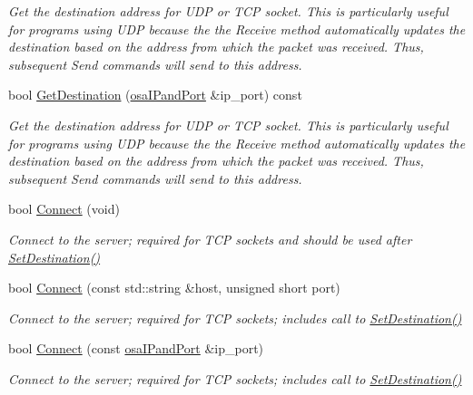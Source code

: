 \begin{DoxyCompactItemize}
\begin{DoxyCompactList}\small\item\em Get the destination address for U\+D\+P or T\+C\+P socket. This is particularly useful for programs using U\+D\+P because the the Receive method automatically updates the destination based on the address from which the packet was received. Thus, subsequent Send commands will send to this address. \end{DoxyCompactList}\item 
bool \hyperlink{classosa_socket_aa8030ca721b7d095cf26ca40e6d237a3}{Get\+Destination} (\hyperlink{structosa_i_pand_port}{osa\+I\+Pand\+Port} \&ip\+\_\+port) const 
\begin{DoxyCompactList}\small\item\em Get the destination address for U\+D\+P or T\+C\+P socket. This is particularly useful for programs using U\+D\+P because the the Receive method automatically updates the destination based on the address from which the packet was received. Thus, subsequent Send commands will send to this address. \end{DoxyCompactList}\item 
bool \hyperlink{classosa_socket_a26e1010cd5c499ed8b0b3ab6a43a50cd}{Connect} (void)
\begin{DoxyCompactList}\small\item\em Connect to the server; required for T\+C\+P sockets and should be used after \hyperlink{classosa_socket_a5a02b283355bf2beff6217bb2e01c03a}{Set\+Destination()} \end{DoxyCompactList}\item 
bool \hyperlink{classosa_socket_a003dbb8706ca2a332b8f2a8187626847}{Connect} (const std\+::string \&host, unsigned short port)
\begin{DoxyCompactList}\small\item\em Connect to the server; required for T\+C\+P sockets; includes call to \hyperlink{classosa_socket_a5a02b283355bf2beff6217bb2e01c03a}{Set\+Destination()} \end{DoxyCompactList}\item 
bool \hyperlink{classosa_socket_a90a8bc0002ea1bcdd3c1a48c9f7c1252}{Connect} (const \hyperlink{structosa_i_pand_port}{osa\+I\+Pand\+Port} \&ip\+\_\+port)
\begin{DoxyCompactList}\small\item\em Connect to the server; required for T\+C\+P sockets; includes call to \hyperlink{classosa_socket_a5a02b283355bf2beff6217bb2e01c03a}{Set\+Destination()} \end{DoxyCompactList}\item 

\end{DoxyCompactItemize}
